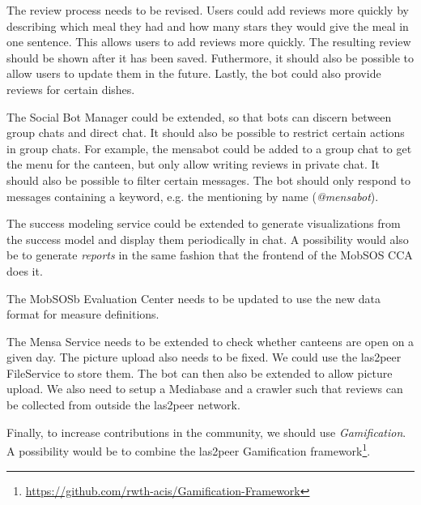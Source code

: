 The review process needs to be revised. Users could add reviews more quickly by describing which meal they had and how many stars they would give the meal in one sentence. This allows users to add reviews more quickly. The resulting review should be shown after it has been saved. Futhermore, it should also be possible to allow users to update them in the future. Lastly, the bot could also provide reviews for certain dishes.

The Social Bot Manager could be extended, so that bots can discern between group chats and direct chat. It should also be possible to restrict certain actions in group chats. For example, the mensabot could be added to a group chat to get the menu for the canteen, but only allow writing reviews in private chat.
It should also be possible to filter certain messages. The bot should only respond to messages containing a keyword, e.g. the mentioning by name (\emph{@mensabot}).

The success modeling service could be extended to generate visualizations from the success model and display them periodically in chat. A possibility would also be to generate \emph{reports} in the same fashion that the frontend of the MobSOS CCA does it. 

The MobSOSb Evaluation Center needs to be updated to use the new data format for measure definitions.

The Mensa Service needs to be extended to check whether canteens are open on a given day. The picture upload also needs to be fixed. We could use the las2peer FileService to store them. The bot can then also be extended to allow picture upload. 
We also need to setup a Mediabase and a crawler such that reviews can be collected from outside the las2peer network. 

Finally, to increase contributions in the community, we should use \emph{Gamification}. A possibility would be to combine the las2peer Gamification framework\footnote{\url{https://github.com/rwth-acis/Gamification-Framework}}.
